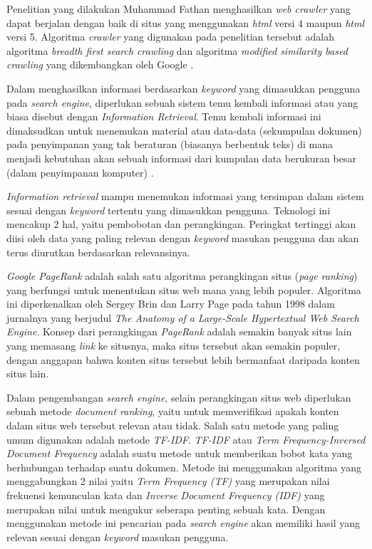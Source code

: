 Penelitian yang dilakukan Muhammad Fathan menghasilkan \textit{web crawler} yang dapat berjalan dengan baik di situs yang menggunakan \textit{html} versi 4 maupun \textit{html} versi 5. Algoritma \textit{crawler} yang digunakan pada penelitian tersebut adalah algoritma \textit{breadth first search crawling} dan algoritma \textit{modified similarity based crawling} yang dikembangkan oleh Google \citep{fathan2021perancangan}.

Dalam menghasilkan informasi berdasarkan \textit{keyword} yang dimasukkan pengguna pada \textit{search engine}, diperlukan sebuah sistem temu kembali informasi atau yang biasa disebut dengan \textit{Information Retrieval}. Temu kembali informasi ini dimaksudkan untuk menemukan material atau data-data (sekumpulan dokumen) pada penyimpanan yang tak beraturan (biasanya berbentuk teks) di mana menjadi kebutuhan akan sebuah informasi dari kumpulan data berukuran besar (dalam penyimpanan komputer) \citep{manning2009anintroduction}.

\textit{Information retrieval} mampu menemukan informasi yang tersimpan dalam sistem sesuai dengan \textit{keyword} tertentu yang dimasukkan pengguna. Teknologi ini mencakup 2 hal, yaitu pembobotan dan perangkingan. Peringkat tertinggi akan diisi oleh data yang paling relevan dengan \textit{keyword} masukan pengguna dan akan terus diurutkan berdasarkan relevansinya.

\textit{Google PageRank} adalah salah satu algoritma perangkingan situs (\textit{page ranking}) yang berfungsi untuk menentukan situs web mana yang lebih populer. Algoritma ini diperkenalkan oleh Sergey Brin dan Larry Page pada tahun 1998 dalam jurnalnya yang berjudul \textit{The Anatomy of a Large-Scale Hypertextual Web Search Engine}. Konsep dari perangkingan \textit{PageRank} adalah semakin banyak situs lain yang memasang \textit{link} ke situsnya, maka situs tersebut akan semakin populer, dengan anggapan bahwa konten situs tersebut lebih bermanfaat daripada konten situs lain.

Dalam pengembangan \textit{search engine}, selain perangkingan situs web diperlukan sebuah metode \textit{document ranking}, yaitu untuk memverifikasi apakah konten dalam situs web tersebut relevan atau tidak. Salah satu metode yang paling umum digunakan adalah metode \textit{TF-IDF}. \textit{TF-IDF} atau \textit{Term Frequency-Inversed Document Frequency} adalah suatu metode untuk memberikan bobot kata yang berhubungan terhadap suatu dokumen. Metode ini menggunakan algoritma yang menggabungkan 2 nilai yaitu \textit{Term Frequency (TF)} yang merupakan nilai frekuensi kemunculan kata dan \textit{Inverse Document Frequency (IDF)} yang merupakan nilai untuk mengukur seberapa penting sebuah kata. Dengan menggunakan metode ini pencarian pada \textit{search engine} akan memiliki hasil yang relevan sesuai dengan \textit{keyword} masukan pengguna.

